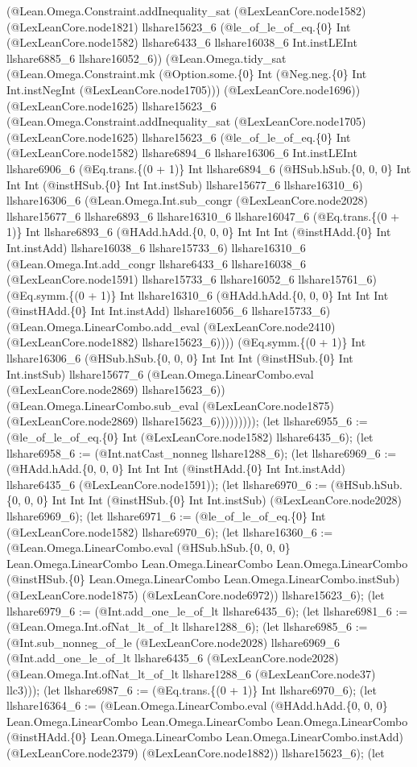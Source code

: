\documentclass[11pt]{article}
\begin{document}
(@Lean.Omega.Constraint.addInequality\_sat (@LexLeanCore.node1582) (@LexLeanCore.node1821) llshare15623\_6 (@le\_of\_le\_of\_eq.\{0\} Int (@LexLeanCore.node1582) llshare6433\_6 llshare16038\_6 Int.instLEInt llshare6885\_6 llshare16052\_6)) (@Lean.Omega.tidy\_sat (@Lean.Omega.Constraint.mk (@Option.some.\{0\} Int (@Neg.neg.\{0\} Int Int.instNegInt (@LexLeanCore.node1705))) (@LexLeanCore.node1696)) (@LexLeanCore.node1625) llshare15623\_6 (@Lean.Omega.Constraint.addInequality\_sat (@LexLeanCore.node1705) (@LexLeanCore.node1625) llshare15623\_6 (@le\_of\_le\_of\_eq.\{0\} Int (@LexLeanCore.node1582) llshare6894\_6 llshare16306\_6 Int.instLEInt llshare6906\_6 (@Eq.trans.\{(0 + 1)\} Int llshare6894\_6 (@HSub.hSub.\{0, 0, 0\} Int Int Int (@instHSub.\{0\} Int Int.instSub) llshare15677\_6 llshare16310\_6) llshare16306\_6 (@Lean.Omega.Int.sub\_congr (@LexLeanCore.node2028) llshare15677\_6 llshare6893\_6 llshare16310\_6 llshare16047\_6 (@Eq.trans.\{(0 + 1)\} Int llshare6893\_6 (@HAdd.hAdd.\{0, 0, 0\} Int Int Int (@instHAdd.\{0\} Int Int.instAdd) llshare16038\_6 llshare15733\_6) llshare16310\_6 (@Lean.Omega.Int.add\_congr llshare6433\_6 llshare16038\_6 (@LexLeanCore.node1591) llshare15733\_6 llshare16052\_6 llshare15761\_6) (@Eq.symm.\{(0 + 1)\} Int llshare16310\_6 (@HAdd.hAdd.\{0, 0, 0\} Int Int Int (@instHAdd.\{0\} Int Int.instAdd) llshare16056\_6 llshare15733\_6) (@Lean.Omega.LinearCombo.add\_eval (@LexLeanCore.node2410) (@LexLeanCore.node1882) llshare15623\_6)))) (@Eq.symm.\{(0 + 1)\} Int llshare16306\_6 (@HSub.hSub.\{0, 0, 0\} Int Int Int (@instHSub.\{0\} Int Int.instSub) llshare15677\_6 (@Lean.Omega.LinearCombo.eval (@LexLeanCore.node2869) llshare15623\_6)) (@Lean.Omega.LinearCombo.sub\_eval (@LexLeanCore.node1875) (@LexLeanCore.node2869) llshare15623\_6))))))))); (let llshare6955\_6 := (@le\_of\_le\_of\_eq.\{0\} Int (@LexLeanCore.node1582) llshare6435\_6); (let llshare6958\_6 := (@Int.natCast\_nonneg llshare1288\_6); (let llshare6969\_6 := (@HAdd.hAdd.\{0, 0, 0\} Int Int Int (@instHAdd.\{0\} Int Int.instAdd) llshare6435\_6 (@LexLeanCore.node1591)); (let llshare6970\_6 := (@HSub.hSub.\{0, 0, 0\} Int Int Int (@instHSub.\{0\} Int Int.instSub) (@LexLeanCore.node2028) llshare6969\_6); (let llshare6971\_6 := (@le\_of\_le\_of\_eq.\{0\} Int (@LexLeanCore.node1582) llshare6970\_6); (let llshare16360\_6 := (@Lean.Omega.LinearCombo.eval (@HSub.hSub.\{0, 0, 0\} Lean.Omega.LinearCombo Lean.Omega.LinearCombo Lean.Omega.LinearCombo (@instHSub.\{0\} Lean.Omega.LinearCombo Lean.Omega.LinearCombo.instSub) (@LexLeanCore.node1875) (@LexLeanCore.node6972)) llshare15623\_6); (let llshare6979\_6 := (@Int.add\_one\_le\_of\_lt llshare6435\_6); (let llshare6981\_6 := (@Lean.Omega.Int.ofNat\_lt\_of\_lt llshare1288\_6); (let llshare6985\_6 := (@Int.sub\_nonneg\_of\_le (@LexLeanCore.node2028) llshare6969\_6 (@Int.add\_one\_le\_of\_lt llshare6435\_6 (@LexLeanCore.node2028) (@Lean.Omega.Int.ofNat\_lt\_of\_lt llshare1288\_6 (@LexLeanCore.node37) llc3))); (let llshare6987\_6 := (@Eq.trans.\{(0 + 1)\} Int llshare6970\_6); (let llshare16364\_6 := (@Lean.Omega.LinearCombo.eval (@HAdd.hAdd.\{0, 0, 0\} Lean.Omega.LinearCombo Lean.Omega.LinearCombo Lean.Omega.LinearCombo (@instHAdd.\{0\} Lean.Omega.LinearCombo Lean.Omega.LinearCombo.instAdd) (@LexLeanCore.node2379) (@LexLeanCore.node1882)) llshare15623\_6); (let 
\end{document}
